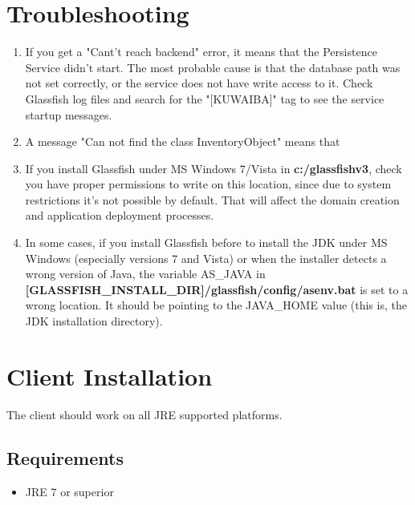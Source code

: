 \documentclass[a4paper]{article}
\begin{document}
			\newpage
			\section{Troubleshooting} \label{sec:Troubleshooting}
				\begin{enumerate}
					\item If you get a "Cant't reach backend" error, it means that the Persistence Service didn't start. The most probable cause is that the database path was not set correctly, or the service does not have write access to it. Check Glassfish log files and search for the "[KUWAIBA]" tag to see the service startup messages.
					\item A message "Can not find the class InventoryObject" means that 
					\item If you install Glassfish under MS Windows 7/Vista in \textbf{c:/glassfishv3}, check you have proper permissions to write on this location, since due to system restrictions it's not possible by default. That will affect the domain creation and application deployment processes.
					\item In some cases, if you install Glassfish before to install the JDK under MS Windows (especially versions 7 and Vista) or when the installer detects a wrong version of Java, the variable AS\_JAVA in \textbf{[GLASSFISH\_INSTALL\_DIR]/glassfish/config/asenv.bat} is set to a wrong location. It should be pointing to the JAVA\_HOME value (this is, the JDK installation directory).
				\end{enumerate}
			\newpage
			\section{Client Installation}
				The client should work on all JRE supported platforms.
				\subsection{Requirements}
					\begin{itemize}
						\item JRE 7 or superior
					\end{itemize}
			
\end{document}
